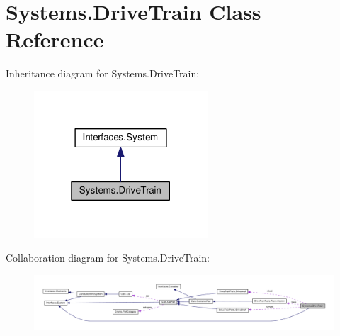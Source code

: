 \hypertarget{classSystems_1_1DriveTrain}{}\section{Systems.\+Drive\+Train Class Reference}
\label{classSystems_1_1DriveTrain}


Inheritance diagram for Systems.\+Drive\+Train\+:\nopagebreak
\begin{figure}[H]
\begin{center}
\leavevmode
\includegraphics[width=184pt]{classSystems_1_1DriveTrain__inherit__graph}
\end{center}
\end{figure}


Collaboration diagram for Systems.\+Drive\+Train\+:
\nopagebreak
\begin{figure}[H]
\begin{center}
\leavevmode
\includegraphics[width=350pt]{classSystems_1_1DriveTrain__coll__graph}
\end{center}
\end{figure}
